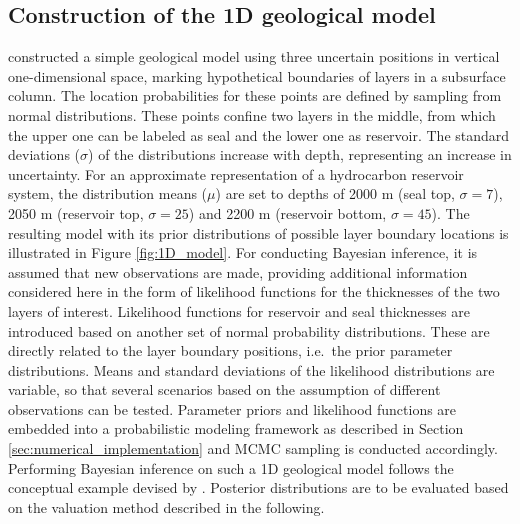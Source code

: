 			\subsection{Construction of the 1D geological model}\label{sec:1D_construction}	
			\citet{delaVarga2016} constructed a simple geological model using three uncertain positions in vertical one-dimensional space, marking hypothetical boundaries of layers in a subsurface column. The location probabilities for these points are defined by sampling from normal distributions. These points confine two layers in the middle, from which the upper one can be labeled as seal and the lower one as reservoir. The standard deviations ($\sigma$) of the distributions increase with depth, representing an increase in uncertainty. For an approximate representation of a hydrocarbon reservoir system, the distribution means ($\mu$) are set to depths of 2000 m (seal top, $\sigma=7$), 2050 m (reservoir top, $\sigma=25$) and 2200 m (reservoir bottom, $\sigma=45$). The resulting model with its prior distributions of possible layer boundary locations is illustrated in Figure \ref{fig:1D_model}.
			For conducting Bayesian inference, it is assumed that new observations are made, providing additional information considered here in the form of likelihood functions for the thicknesses of the two layers of interest. Likelihood functions for reservoir and seal thicknesses are introduced based on another set of normal probability distributions. These are directly related to the layer boundary positions, i.e.\ the prior parameter distributions. Means and standard deviations of the likelihood distributions are variable, so that several scenarios based on the assumption of different observations can be tested. Parameter priors and likelihood functions are embedded into a probabilistic modeling framework as described in Section \ref{sec:numerical_implementation} and MCMC sampling is conducted accordingly. Performing Bayesian inference on such a 1D geological model follows the conceptual example devised by \citet{delaVarga2016}. Posterior distributions are to be evaluated based on the valuation method described in the following.
			
